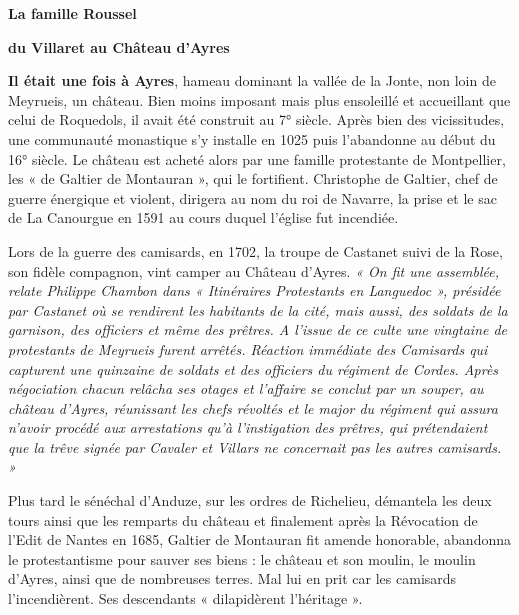 
\begin{center}
{\Large\bfseries La famille Roussel}

\vspace{1em}

{\Large\bfseries du Villaret au Château d’Ayres}
\end{center}

\medskip

\textbf{Il était une fois à Ayres}, hameau dominant la vallée de la Jonte, non loin de Meyrueis, un
château. Bien moins imposant mais plus ensoleillé et accueillant que celui de Roquedols, il
avait été construit au 7° siècle. Après bien des vicissitudes, une communauté monastique s’y
installe en 1025 puis l’abandonne au début du 16° siècle. Le château est acheté alors par une
famille protestante de Montpellier, les « de Galtier de Montauran », qui le fortifient.
Christophe de Galtier, chef de guerre énergique et violent, dirigera au nom du roi de Navarre,
la prise et le sac de La Canourgue en 1591 au cours duquel l’église fut incendiée.

\medskip

Lors de la guerre des camisards, en 1702, la troupe de Castanet suivi de la Rose, son fidèle
compagnon, vint camper au Château d’Ayres. \textit{« On fit une assemblée, relate Philippe
Chambon dans « Itinéraires Protestants en Languedoc », présidée par Castanet où se
rendirent les habitants de la cité, mais aussi, des soldats de la garnison, des officiers et même
des prêtres. A l’issue de ce culte une vingtaine de protestants de Meyrueis furent arrêtés.
Réaction immédiate des Camisards qui capturent une quinzaine de soldats et des officiers du
régiment de Cordes. Après négociation chacun relâcha ses otages et l’affaire se conclut par un souper, au château
d’Ayres, réunissant les chefs révoltés et le major du régiment qui assura n’avoir procédé aux
arrestations qu’à l’instigation des prêtres, qui prétendaient que la trêve signée par Cavaler et
Villars ne concernait pas les autres camisards. »}

\medskip

Plus tard le sénéchal d’Anduze, sur les ordres de Richelieu, démantela les deux tours ainsi que
les remparts du château et finalement après la Révocation de l’Edit de Nantes en 1685, Galtier
de Montauran fit amende honorable, abandonna le protestantisme pour sauver ses biens : le
château et son moulin, le moulin d’Ayres, ainsi que de nombreuses terres.
Mal lui en prit car les camisards l’incendièrent. Ses descendants « dilapidèrent l’héritage ».

